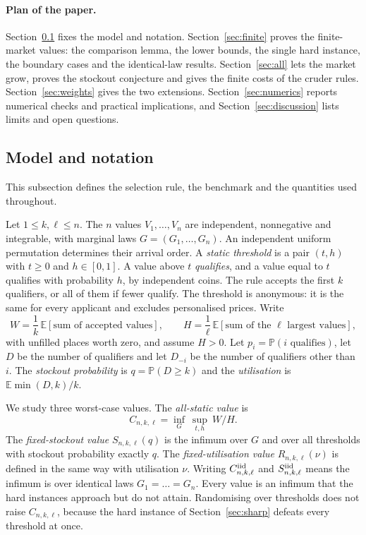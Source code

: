 \documentclass[11pt,a4paper]{article}
\theoremstyle{remark}
\newcommand{\E}{\mathbb E}
\newcommand{\Prob}{\mathbb P}
\begin{document}
\paragraph{Plan of the paper.}
Section~\ref{sec:model} fixes the model and notation. Section~\ref{sec:finite} proves the finite-market values: the comparison lemma, the lower bounds, the single hard instance, the boundary cases and the identical-law results. Section~\ref{sec:all} lets the market grow, proves the stockout conjecture and gives the finite costs of the cruder rules. Section~\ref{sec:weights} gives the two extensions. Section~\ref{sec:numerics} reports numerical checks and practical implications, and Section~\ref{sec:discussion} lists limits and open questions.

\subsection{Model and notation}\label{sec:model}
This subsection defines the selection rule, the benchmark and the quantities used throughout.

Let $1\le k,\ell\le n$. The $n$ values $V_1,\dots,V_n$ are independent, nonnegative and integrable, with marginal laws $G=(G_1,\dots,G_n)$. An independent uniform permutation determines their arrival order. A \emph{static threshold} is a pair $(t,h)$ with $t\ge0$ and $h\in[0,1]$. A value above $t$ \emph{qualifies}, and a value equal to $t$ qualifies with probability $h$, by independent coins. The rule accepts the first $k$ qualifiers, or all of them if fewer qualify. The threshold is anonymous: it is the same for every applicant and excludes personalised prices. Write
\[
 W=\frac1k\,\E[\text{sum of accepted values}],\qquad H=\frac1\ell\,\E[\text{sum of the $\ell$ largest values}],
\]
with unfilled places worth zero, and assume $H>0$. Let $p_i=\Prob(i\text{ qualifies})$, let $D$ be the number of qualifiers and let $D_{-i}$ be the number of qualifiers other than $i$. The \emph{stockout probability} is $q=\Prob(D\ge k)$ and the \emph{utilisation} is $\E\min(D,k)/k$.

We study three worst-case values. The \emph{all-static value} is
\[
 C_{n,k,\ell}=\inf_G\ \sup_{t,h}\ W/H .
\]
The \emph{fixed-stockout value} $S_{n,k,\ell}(q)$ is the infimum over $G$ and over all thresholds with stockout probability exactly $q$. The \emph{fixed-utilisation value} $R_{n,k,\ell}(\nu)$ is defined in the same way with utilisation $\nu$. Writing $C^{\rm iid}_{n,k,\ell}$ and $S^{\rm iid}_{n,k,\ell}$ means the infimum is over identical laws $G_1=\dots=G_n$. Every value is an infimum that the hard instances approach but do not attain. Randomising over thresholds does not raise $C_{n,k,\ell}$, because the hard instance of Section~\ref{sec:sharp} defeats every threshold at once.
\end{document}
